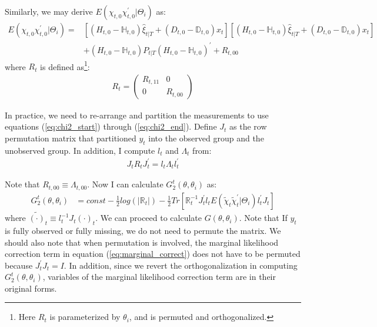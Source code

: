 \documentclass[10pt, titlepage]{article}
\numberwithin{equation}{section}
\begin{document}
Similarly, we may derive $E(\chi_{t,0}\chi_{t,0}^{'}|\Theta_i)$ as:
\begin{align}
    E(\chi_{t,0}\chi_{t,0}^{'}|\Theta_i) =& [(H_{t,0}-\mathbb{H}_{t,0})\hat{\xi}_{t|T}+(D_{t,0}-\mathbb{D}_{t,0})x_t]
        [(H_{t,0}-\mathbb{H}_{t,0})\hat{\xi}_{t|T}+(D_{t,0}-\mathbb{D}_{t,0})x_t] \label{eq:chi2_end} \\
    &+ (H_{t,0}-\mathbb{H}_{t,0})P_{t|T}(H_{t,0}-\mathbb{H}_{t,0})^{'} + R_{t,00} \nonumber
\end{align}
where $R_t$ is defined as\footnote{Here $R_t$ is parameterized by $\theta_i$, and is permuted and orthogonalized.}:
\begin{align*}
    R_t = \begin{pmatrix}
        R_{t,11} & 0 \\
        0 & R_{t,00}
    \end{pmatrix}
\end{align*}

In practice, we need to re-arrange and partition the measurements to use equations (\ref{eq:chi2_start}) through (\ref{eq:chi2_end}). Define $J_t$ as the row permutation matrix that partitioned $y_t$ into the observed group and the unobserved group. In addition, I compute $l_t$ and $\Lambda_t$ from:
\begin{align*}
    J_tR_tJ_t^{'} = l_t\Lambda_tl_t^{'}
\end{align*}

Note that $R_{t,00} \equiv \Lambda_{t,00}$. Now I can calculate $G_2^{t}(\theta,\theta_i)$ as: 
\begin{align}
    G_2^{t}(\theta, \theta_i) &= const - \frac{1}{2}log(|\mathbb{R}_t|)-\frac{1}{2}Tr[\mathbb{R}_t^{-1}J_t^{'}l_tE(\tilde{\chi}_t\tilde{\chi}_t^{'}|\Theta_{i})l_t^{'}J_t] 
\end{align}
where $\tilde{(\cdot)}_t \equiv l_t^{-1}J_t(\cdot)_t$. We can proceed to calculate $G(\theta,\theta_i)$. Note that If $y_t$ is fully observed or fully missing, we do not need to permute the matrix. We should also note that when permutation is involved, the marginal likelihood correction term in equation (\ref{eq:marginal_correct}) does not have to be permuted because $J_t^{'}J_t=I$. In addition, since we revert the orthogonalization in computing $G_2^{t}(\theta,\theta_i)$, variables of the marginal likelihood correction term are in their original forms.
\end{document}
